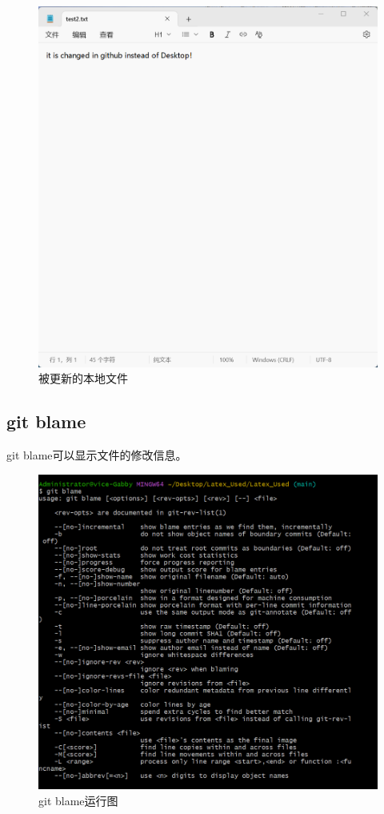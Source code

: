 \documentclass{article}
\begin{document}
\begin{figure}[H]
    \centering
    \includegraphics[width=1\linewidth]{本地文件.png}
    \caption{被更新的本地文件}
    \label{fig:pull2}
\end{figure}

\subsection{git blame}
git blame可以显示文件的修改信息。
\begin{figure}[H]
    \centering
    \includegraphics[width=1\linewidth]{git_blame.png}
    \caption{git blame运行图}
    \label{fig:blame}
\end{figure}
\end{document}
